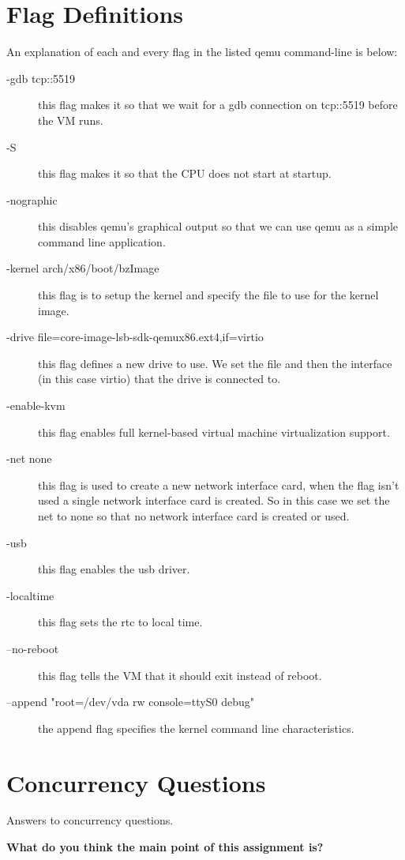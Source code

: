 \documentclass[10pt,letterpaper,draftclsnofoot,onecolumn]{IEEEtran}
\begin{document}
\section{Flag Definitions}
\noindent An explanation of each and every flag in the listed qemu command-line is below:
\begin{description}
\item [-gdb tcp::5519] this flag makes it so that we wait for a gdb connection on tcp::5519 before the VM runs.
\item [-S] this flag makes it so that the CPU does not start at startup.
\item [-nographic] this disables qemu's graphical output so that we can use qemu as a simple command line application.
\item [-kernel arch/x86/boot/bzImage] this flag is to setup the kernel and specify the file to use for the kernel image.
\item [-drive file=core-image-lsb-sdk-qemux86.ext4,if=virtio] this flag defines a new drive to use. We set the file and then the interface (in this case virtio) that the drive is connected to.
\item [-enable-kvm] this flag enables full kernel-based virtual machine virtualization support.
\item [-net none] this flag is used to create a new network interface card, when the flag isn’t used a single network interface card is created. So in this case we set the net to none so that no network interface card is created or used.
\item [-usb] this flag enables the usb driver.
\item [-localtime] this flag sets the rtc to local time.
\item [--no-reboot] this flag tells the VM that it should exit instead of reboot.
\item [--append "root=/dev/vda rw console=ttyS0 debug"] the append flag specifies the kernel command line characteristics.
\end{description}

\section{Concurrency Questions}
\noindent Answers to concurrency questions\cite{semaphore}.

\noindent\textbf{What do you think the main point of this assignment is?}

\end{document}
